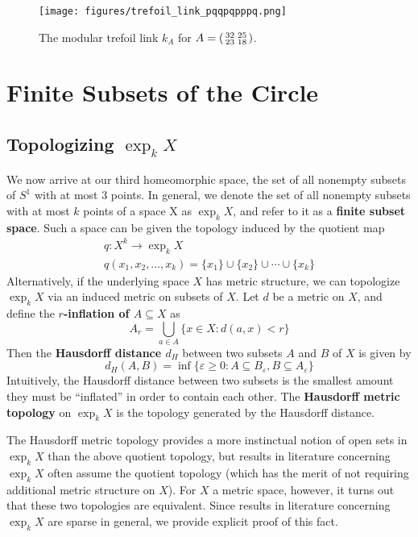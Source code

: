 \documentclass[12pt,twoside]{reedthesis}
\theoremstyle{definition}
\newcommand{\defnphrase}[1]{\textbf{#1}}
\begin{document}
\begin{figure}[h]
  \centering
  \texttt{[image: figures/trefoil\_link\_pqqpqpppq.png]}
  \caption{The modular trefoil link $k_A$ for $A = \protect\begin{psmallmatrix}32 & 25 \\ 23 & 18\protect\end{psmallmatrix}$.}
  \label{fig:trefoil_link_pqqpqpppq}
\end{figure}

\chapter{Finite Subsets of the Circle}\label{chap:finite_subsets}

\section{Topologizing $\exp_k X$}

We now arrive at our third homeomorphic space, the set of all nonempty subsets of $S^1$ with at most 3 points.
In general, we denote the set of all nonempty subsets with at most $k$ points of a space X as $\exp_k X$, and refer to it as a \defnphrase{finite subset space}.
Such a space can be given the topology induced by the quotient map
\begin{gather*}
  q : X^k \to \exp_k X \\
  q(x_1, x_2, \ldots, x_k) = \{x_1\} \cup \{x_2\} \cup \cdots \cup \{x_k\}
\end{gather*}
Alternatively, if the underlying space $X$ has metric structure, we can topologize $\exp_k X$ via an induced metric on subsets of $X$.
Let $d$ be a metric on $X$, and define the \defnphrase{$r$-inflation of $A \subseteq X$} as
\begin{equation*}
  A_r = \bigcup_{a \in A} \{ x \in X : d(a, x) < r \}
\end{equation*}
Then the \defnphrase{Hausdorff distance $d_H$} between two subsets $A$ and $B$ of $X$ is given by
\begin{equation*}
  d_H(A, B) = \inf \{ \varepsilon \geq 0 : A \subseteq B_\varepsilon, B \subseteq A_\varepsilon \}
\end{equation*}
Intuitively, the Hausdorff distance between two subsets is the smallest amount they must be ``inflated'' in order to contain each other.
The \defnphrase{Hausdorff metric topology} on $\exp_k X$ is the topology generated by the Hausdorff distance.

The Hausdorff metric topology provides a more instinctual notion of open sets in $\exp_k X$ than the above quotient topology, but results in literature concerning $\exp_k X$ often assume the quotient topology (which has the merit of not requiring additional metric structure on $X$).
For $X$ a metric space, however, it turns out that these two topologies are equivalent.
Since results in literature concerning $\exp_k X$ are sparse in general, we provide explicit proof of this fact.
\end{document}
